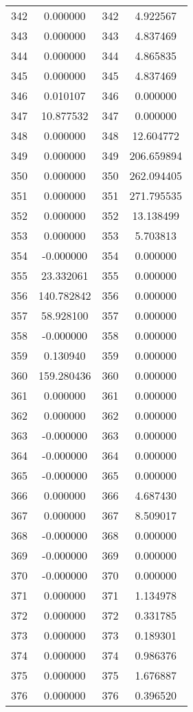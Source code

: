 \documentclass[12pt]{article}
\begin{document}
\begin{longtable}{@{}cccc@{}}
342 & 0.000000 & 342 & 4.922567 \\
343 & 0.000000 & 343 & 4.837469 \\
344 & 0.000000 & 344 & 4.865835 \\
345 & 0.000000 & 345 & 4.837469 \\
346 & 0.010107 & 346 & 0.000000 \\
347 & 10.877532 & 347 & 0.000000 \\
348 & 0.000000 & 348 & 12.604772 \\
349 & 0.000000 & 349 & 206.659894 \\
350 & 0.000000 & 350 & 262.094405 \\
351 & 0.000000 & 351 & 271.795535 \\
352 & 0.000000 & 352 & 13.138499 \\
353 & 0.000000 & 353 & 5.703813 \\
354 & -0.000000 & 354 & 0.000000 \\
355 & 23.332061 & 355 & 0.000000 \\
356 & 140.782842 & 356 & 0.000000 \\
357 & 58.928100 & 357 & 0.000000 \\
358 & -0.000000 & 358 & 0.000000 \\
359 & 0.130940 & 359 & 0.000000 \\
360 & 159.280436 & 360 & 0.000000 \\
361 & 0.000000 & 361 & 0.000000 \\
362 & 0.000000 & 362 & 0.000000 \\
363 & -0.000000 & 363 & 0.000000 \\
364 & -0.000000 & 364 & 0.000000 \\
365 & -0.000000 & 365 & 0.000000 \\
366 & 0.000000 & 366 & 4.687430 \\
367 & 0.000000 & 367 & 8.509017 \\
368 & -0.000000 & 368 & 0.000000 \\
369 & -0.000000 & 369 & 0.000000 \\
370 & -0.000000 & 370 & 0.000000 \\
371 & 0.000000 & 371 & 1.134978 \\
372 & 0.000000 & 372 & 0.331785 \\
373 & 0.000000 & 373 & 0.189301 \\
374 & 0.000000 & 374 & 0.986376 \\
375 & 0.000000 & 375 & 1.676887 \\
376 & 0.000000 & 376 & 0.396520 \\

\end{longtable}
\end{document}
